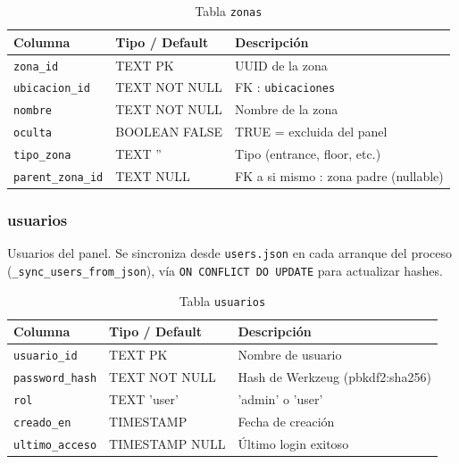\documentclass[12pt, a4paper]{article}
\begin{document}
\begin{table}[H]
\centering
\renewcommand{\arraystretch}{1.2}
\begin{tabular}{llp{5.5cm}}
\toprule
\textbf{Columna} & \textbf{Tipo / Default} & \textbf{Descripción} \\
\midrule
\texttt{zona\_id}        & TEXT PK          & UUID de la zona \\
\texttt{ubicacion\_id}   & TEXT NOT NULL    & FK : \texttt{ubicaciones} \\
\texttt{nombre}          & TEXT NOT NULL    & Nombre de la zona \\
\texttt{oculta}          & BOOLEAN FALSE    & TRUE = excluida del panel \\
\texttt{tipo\_zona}      & TEXT ''          & Tipo (entrance, floor, etc.) \\
\texttt{parent\_zona\_id} & TEXT NULL       & FK a si mismo : zona padre (nullable)\\
\bottomrule
\end{tabular}
\caption{Tabla \texttt{zonas}}
\end{table}

\subsubsection{usuarios}

Usuarios del panel. Se sincroniza desde \texttt{users.json} en cada arranque del proceso (\texttt{\_sync\_users\_from\_json}), vía \texttt{ON CONFLICT DO UPDATE} para actualizar hashes.

\begin{table}[H]
\centering
\renewcommand{\arraystretch}{1.2}
\begin{tabular}{llp{5.5cm}}
\toprule
\textbf{Columna} & \textbf{Tipo / Default} & \textbf{Descripción} \\
\midrule
\texttt{usuario\_id}    & TEXT PK          & Nombre de usuario \\
\texttt{password\_hash} & TEXT NOT NULL    & Hash de Werkzeug (pbkdf2:sha256)\\
\texttt{rol}            & TEXT 'user'      & 'admin' o 'user' \\
\texttt{creado\_en}     & TIMESTAMP        & Fecha de creación \\
\texttt{ultimo\_acceso} & TIMESTAMP NULL   & Último login exitoso \\
\bottomrule
\end{tabular}
\caption{Tabla \texttt{usuarios}}
\end{table}
\end{document}
